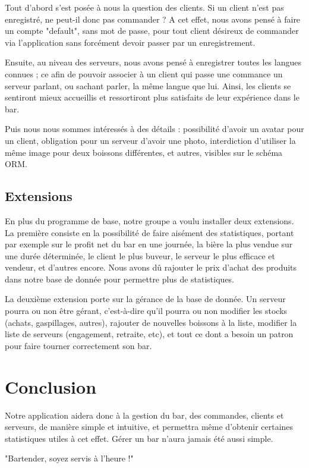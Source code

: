 \documentclass{article}
\begin{document}
Tout d'abord s'est posée à nous la question des clients. Si un client n'est pas enregistré, ne peut-il donc pas commander ? A cet effet, nous avons pensé à faire un compte "default", sans mot de passe, pour tout client désireux de commander via l'application sans forcément devoir passer par un enregistrement.

Ensuite, au niveau des serveurs, nous avons pensé à enregistrer toutes les langues connues ; ce afin de pouvoir associer à un client qui passe une commance un serveur parlant, ou sachant parler, la même langue que lui. Ainsi, les clients se sentiront mieux accueillis et ressortiront plus satisfaits de leur expérience dans le bar.

Puis nous nous sommes intéressés à des détails : possibilité d'avoir un avatar pour un client, obligation pour un serveur d'avoir une photo, interdiction d'utiliser la même image pour deux boissons différentes, et autres, visibles sur le schéma ORM.

\subsection{Extensions}
En plus du programme de base, notre groupe a voulu installer deux extensions.
La première consiste en la possibilité de faire aisément des statistiques, portant par exemple sur le profit net du bar en une journée, la bière la plus vendue sur une durée déterminée, le client le plus buveur, le serveur le plus efficace et vendeur, et d'autres encore. Nous avons dû rajouter le prix d'achat des produits dans notre base de donnée pour permettre plus de statistiques.

La deuxième extension porte sur la gérance de la base de donnée. Un serveur pourra ou non être gérant, c'est-à-dire qu'il pourra ou non modifier les stocks (achats, gaspillages, autres), rajouter de nouvelles boissons à la liste, modifier la liste de serveurs (engagement, retraite, etc), et tout ce dont a besoin un patron pour faire tourner correctement son bar.

\section{Conclusion}
Notre application aidera donc à la gestion du bar, des commandes, clients et serveurs, de manière simple et intuitive, et permettra même d'obtenir certaines statistiques utiles à cet effet. Gérer un bar n'aura jamais été aussi simple.


"Bartender, soyez servis à l'heure !"
\end{document}
